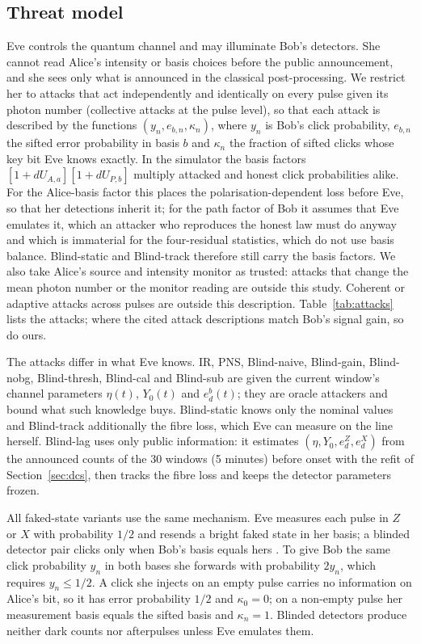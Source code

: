 \subsection{Threat model}
Eve controls the quantum channel and may illuminate Bob's detectors. She cannot read Alice's intensity or basis choices before the public announcement, and she sees only what is announced in the classical post-processing. We restrict her to attacks that act independently and identically on every pulse given its photon number (collective attacks at the pulse level), so that each attack is described by the functions $(y_n,e_{b,n},\kappa_n)$, where $y_n$ is Bob's click probability, $e_{b,n}$ the sifted error probability in basis $b$ and $\kappa_n$ the fraction of sifted clicks whose key bit Eve knows exactly. In the simulator the basis factors $[1+dU_{A,a}][1+dU_{P,b}]$ multiply attacked and honest click probabilities alike. For the Alice-basis factor this places the polarisation-dependent loss before Eve, so that her detections inherit it; for the path factor of Bob it assumes that Eve emulates it, which an attacker who reproduces the honest law must do anyway and which is immaterial for the four-residual statistics, which do not use basis balance. Blind-static and Blind-track therefore still carry the basis factors. We also take Alice's source and intensity monitor as trusted: attacks that change the mean photon number or the monitor reading \cite{sajeed2015,huang2019} are outside this study. Coherent or adaptive attacks across pulses are outside this description. Table~\ref{tab:attacks} lists the attacks; where the cited attack descriptions match Bob's signal gain, so do ours.

The attacks differ in what Eve knows. IR, PNS, Blind-naive, Blind-gain, Blind-nobg, Blind-thresh, Blind-cal and Blind-sub are given the current window's channel parameters $\eta(t)$, $Y_0(t)$ and $e^b_d(t)$; they are oracle attackers and bound what such knowledge buys. Blind-static knows only the nominal values and Blind-track additionally the fibre loss, which Eve can measure on the line herself. Blind-lag uses only public information: it estimates $(\eta,Y_0,e^Z_d,e^X_d)$ from the announced counts of the 30 windows (5 minutes) before onset with the refit of Section~\ref{sec:dcs}, then tracks the fibre loss and keeps the detector parameters frozen.

All faked-state variants use the same mechanism. Eve measures each pulse in $Z$ or $X$ with probability $1/2$ and resends a bright faked state in her basis; a blinded detector pair clicks only when Bob's basis equals hers \cite{makarov2005,lydersen2010}. To give Bob the same click probability $y_n$ in both bases she forwards with probability $2y_n$, which requires $y_n\leq1/2$. A click she injects on an empty pulse carries no information on Alice's bit, so it has error probability $1/2$ and $\kappa_0=0$; on a non-empty pulse her measurement basis equals the sifted basis and $\kappa_n=1$. Blinded detectors produce neither dark counts nor afterpulses unless Eve emulates them.

